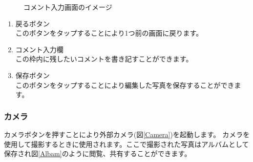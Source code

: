 \documentclass[a4j]{jarticle}
\begin{document}
\begin{figure}[H]
    \begin{center}
    \caption {コメント入力画面のイメージ}
    \label{Comment}
    \end{center}
\end{figure}

\begin{enumerate}
\item 戻るボタン\\
     このボタンをタップすることにより1つ前の画面に戻ります。
\item コメント入力欄\\
     この枠内に残したいコメントを書き記すことができます。
\item 保存ボタン\\
     このボタンをタップすることにより編集した写真を保存することができます。
\end{enumerate}

\subsubsection{カメラ}
カメラボタンを押すことにより外部カメラ(図\ref{Camera})を起動します。
カメラを使用して撮影するときに使用されます。ここで撮影された写真はアルバムとして保存され図\ref{Albam}のように閲覧、共有することができます。
\end{document}
